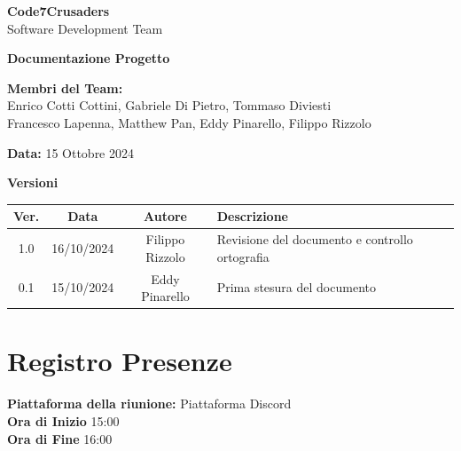 \documentclass{article}
\begin{document}
\begin{center}
    {\Huge \textbf{Code7Crusaders}}\\
    \vspace{0.5cm}
    {\Large Software Development Team}\\
    \vspace{2cm}
    
    {\large \textbf{Documentazione Progetto}}\\
    \vspace{5cm}

    \textbf{Membri del Team:}\\
    Enrico Cotti Cottini, Gabriele Di Pietro, Tommaso Diviesti \\
    Francesco Lapenna, Matthew Pan, Eddy Pinarello, Filippo Rizzolo \\
    \vspace{0.5cm}
    
    {\large \textbf{Data: }15 Ottobre 2024}     
    \vspace{1cm}
\end{center}

\newpage
\begin{table}[h!]
\centering
\textbf{Versioni} \\ %
\vspace{2mm} %
\begin{tabular}{|c|c|c|l|}
    \hline
    \textbf{Ver.} & \textbf{Data} & \textbf{Autore} & \textbf{Descrizione} \\
    \hline
    1.0 & 16/10/2024 & Filippo Rizzolo & Revisione del documento e controllo ortografia \\ 
    \hline
    0.1 & 15/10/2024 & Eddy Pinarello & Prima stesura del documento \\ 
    \hline
\end{tabular}
\end{table}

\newpage
\tableofcontents
\newpage

\section{Registro Presenze}
\textbf{Piattaforma della riunione:} Piattaforma Discord \\
\textbf{Ora di Inizio} 15:00\\
\textbf{Ora di Fine} 16:00
\vspace{10mm} 
\end{document}
